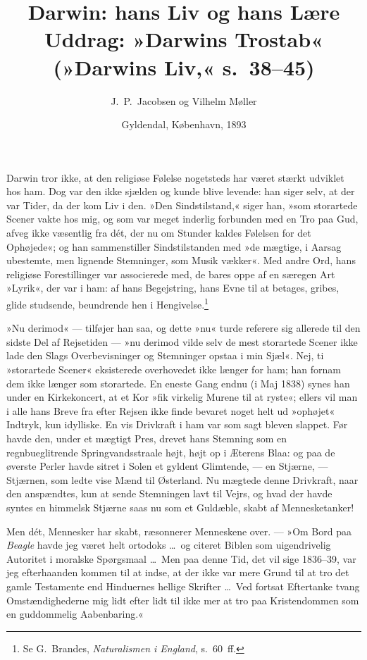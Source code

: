 \documentclass[12pt,a4paper]{article}
\title{\textbf{Darwin: hans Liv og hans Lære}\\[0.4em]
\large Uddrag: »Darwins Trostab«\\ (»Darwins Liv,« s.\ 38--45)}
\author{J.\ P.\ Jacobsen og Vilhelm Møller}
\date{Gyldendal, København, 1893}
\begin{document}
\maketitle
\thispagestyle{fancy}

\bigskip

\noindent Darwin tror ikke, at den religiøse Følelse nogetsteds har
været stærkt udviklet hos ham. Dog var den ikke sjælden og
kunde blive levende: han siger selv, at der var Tider, da der kom
Liv i den. »Den Sindstilstand,« siger han, »som storartede Scener
vakte hos mig, og som var meget inderlig forbunden med en Tro
paa Gud, afveg ikke væsentlig fra dét, der nu om Stunder kaldes
Følelsen for det Ophøjede«; og han sammenstiller Sindstilstanden
med »de mægtige, i Aarsag ubestemte, men lignende Stemninger,
som Musik vækker«. Med andre Ord, hans religiøse Forestillinger
var associerede med, de bares oppe af en særegen Art »Lyrik«,
der var i ham: af hans Begejstring, hans Evne til at betages,
gribes, glide studsende, beundrende hen i Hengivelse.\footnote{Se
G.\ Brandes, \emph{Naturalismen i England}, s.\ 60~ff.}

»Nu derimod« — tilføjer han saa, og dette »nu« turde referere
sig allerede til den sidste Del af Rejsetiden — »nu derimod
vilde selv de mest storartede Scener ikke lade den Slags
Overbevisninger og Stemninger opstaa i min Sjæl«. Nej, ti
»storartede Scener« eksisterede overhovedet ikke længer for ham;
han fornam dem ikke længer som storartede. En eneste Gang endnu
(i Maj 1838) synes han under en Kirkekoncert, at et Kor »fik
virkelig Murene til at ryste«; ellers vil man i alle hans Breve
fra efter Rejsen ikke finde bevaret noget helt ud »ophøjet«
Indtryk, kun idylliske. En vis Drivkraft i ham var som sagt
bleven slappet. Før havde den, under et mægtigt Pres, drevet
hans Stemning som en regnbueglitrende Springvandsstraale højt,
højt op i Æterens Blaa: og paa de øverste Perler havde sitret i
Solen et gyldent Glimtende, — en Stjærne, — Stjærnen, som ledte
vise Mænd til Østerland. Nu mægtede denne Drivkraft, naar den
anspændtes, kun at sende Stemningen lavt til Vejrs, og hvad der
havde syntes en himmelsk Stjærne saas nu som et Guldæble, skabt
af Mennesketanker!

Men dét, Mennesker har skabt, ræsonnerer Menneskene over. —
»Om Bord paa \emph{Beagle} havde jeg været helt ortodoks \ldots\
og citeret Biblen som uigendrivelig Autoritet i moralske
Spørgsmaal \ldots\ Men paa denne Tid, det vil sige 1836--39,
var jeg efterhaanden kommen til at indse, at der ikke var mere
Grund til at tro det gamle Testamente end Hinduernes hellige
Skrifter \ldots\ Ved fortsat Eftertanke tvang Omstændighederne
mig lidt efter lidt til ikke mer at tro paa Kristendommen som en
guddommelig Aabenbaring.«
\end{document}
